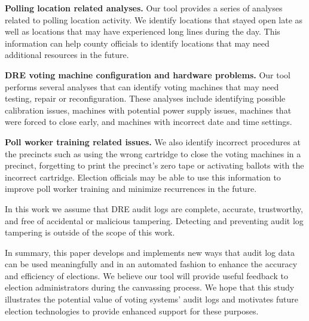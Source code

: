 \textbf{Polling location related analyses.} Our tool provides a series of analyses related to polling location activity. We identify locations that stayed open late as well as locations that may have experienced long lines during the day. This information can help county officials to identify locations that may need additional resources in the future. 

\textbf{DRE voting machine configuration and hardware problems.} Our tool performs several analyses that can identify  voting machines that may need testing, repair or reconfiguration. These analyses include identifying possible calibration issues, machines with potential power supply issues, machines that were forced to close early, and machines with incorrect date and time settings.

\textbf{Poll worker training related issues.} We also identify incorrect procedures at the precincts such as using the wrong cartridge to close the voting machines in a precinct, forgetting to print the precinct's zero tape or activating ballots with the incorrect cartridge. Election officials may be able to use this information to improve poll worker training and minimize recurrences in the future.

In this work we assume that DRE audit logs are complete, accurate,  trustworthy, and free of accidental or malicious tampering. Detecting and preventing audit log tampering is outside of the scope of this work.

In summary, this paper develops and implements new ways that audit log data can be used meaningfully and in an automated fashion to enhance the accuracy and efficiency of elections. We believe our tool will provide useful feedback to election administrators during the canvassing process. We hope that this study illustrates the potential value of voting systems' audit logs and motivates future election technologies to provide enhanced support for these purposes.

